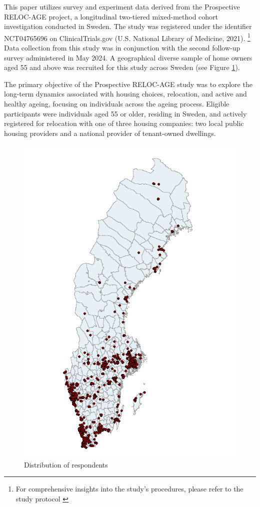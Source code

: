 \documentclass[3p,11pt ]{elsarticle}
\begin{document}
This paper utilizes survey and experiment data derived from the Prospective RELOC-AGE project,
a longitudinal two-tiered mixed-method cohort investigation conducted in Sweden.
The study was registered under the identifier NCT04765696 on ClinicalTrials.gov (U.S. National Library of Medicine, 2021).
\footnote{For comprehensive insights into the study's procedures,
please refer to the study protocol  \cite{zingmarkExploringAssociationsHousing2021}}
Data collection from this study was in conjunction with the second follow-up survey administered in May 2024.
A geographical diverse sample of home owners aged 55 and above was recruited for this study across Sweden (see Figure \ref{fig:map}).

The primary objective of the Prospective RELOC-AGE study was to explore the long-term dynamics associated with housing choices, relocation, and active and healthy ageing, focusing on individuals across the ageing process.
Eligible participants were individuals aged 55 or older, residing in Sweden, and actively registered for relocation with one of three housing companies: two local public housing providers and a national provider of tenant-owned dwellings.

\begin{figure}
\centering
\includegraphics[scale=0.5]{figures/survey_location.png}
\caption{Distribution of respondents \label{fig:map}}
\end{figure}
\end{document}
